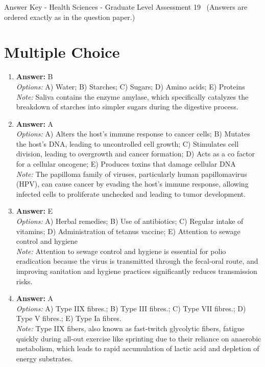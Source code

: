 \documentclass[12pt]{article}
\begin{document}
\begin{center}
Answer Key - Health Sciences - Graduate Level Assessment 19 \
\small (Answers are ordered exactly as in the question paper.)
\end{center}

\section*{Multiple Choice}
\begin{enumerate}[label=\arabic*.]
\item \textbf{Answer:} B
\\ \textit{Options:} A) Water; B) Starches; C) Sugars; D) Amino acids; E) Proteins
\\ \textit{Note:} Saliva contains the enzyme amylase, which specifically catalyzes the breakdown of starches into simpler sugars during the digestive process.
\item \textbf{Answer:} A
\\ \textit{Options:} A) Alters the host's immune response to cancer cells; B) Mutates the host's DNA, leading to uncontrolled cell growth; C) Stimulates cell division, leading to overgrowth and cancer formation; D) Acts as a co factor for a cellular oncogene; E) Produces toxins that damage cellular DNA
\\ \textit{Note:} The papilloma family of viruses, particularly human papillomavirus (HPV), can cause cancer by evading the host's immune response, allowing infected cells to proliferate unchecked and leading to tumor development.
\item \textbf{Answer:} E
\\ \textit{Options:} A) Herbal remedies; B) Use of antibiotics; C) Regular intake of vitamins; D) Administration of tetanus vaccine; E) Attention to sewage control and hygiene
\\ \textit{Note:} Attention to sewage control and hygiene is essential for polio eradication because the virus is transmitted through the fecal-oral route, and improving sanitation and hygiene practices significantly reduces transmission risks.
\item \textbf{Answer:} A
\\ \textit{Options:} A) Type IIX fibres.; B) Type III fibres.; C) Type VII fibres.; D) Type V fibres.; E) Type Ia fibres.
\\ \textit{Note:} Type IIX fibers, also known as fast-twitch glycolytic fibers, fatigue quickly during all-out exercise like sprinting due to their reliance on anaerobic metabolism, which leads to rapid accumulation of lactic acid and depletion of energy substrates.

\end{enumerate}
\end{document}
